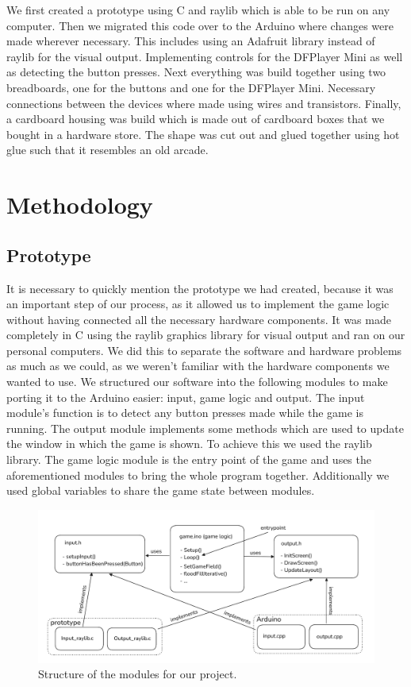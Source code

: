 \documentclass[10pt, a4paper]{article}
\begin{document}
We first created a prototype using C and raylib which is able to be run on any computer. Then we migrated this code over to the Arduino where changes were made wherever necessary. This includes using an Adafruit library instead of raylib for the visual output. Implementing controls for the DFPlayer Mini as well as detecting the button presses. Next everything was build together using two breadboards, one for the buttons and one for the DFPlayer Mini. Necessary connections between the devices where made using wires and transistors. Finally, a cardboard housing was build which is made out of cardboard boxes that we bought in a hardware store. The shape was cut out and glued together using hot glue such that it resembles an old arcade.

\section*{Methodology}

\subsection*{Prototype}

It is necessary to quickly mention the prototype we had created, because it was an important step of our process, as it allowed us to implement the game logic without having connected all the necessary hardware components. It was made completely in C using the raylib graphics library for visual output and ran on our personal computers. We did this to separate the software and hardware problems as much as we could, as we weren't familiar with the hardware components we wanted to use. We structured our software into the following modules to make porting it to the Arduino easier: input, game logic and output. The input module's function is to detect any button presses made while the game is running. The output module implements some methods which are used to update the window in which the game is shown. To achieve this we used the raylib library. The game logic module is the entry point of the game and uses the aforementioned modules to bring the whole program together. Additionally we used global variables to share the game state between modules.

\begin{figure}[h]
\centering
\includegraphics[width=\textwidth]{module_structure.png}
\caption{Structure of the modules for our project.}
\end{figure}
\end{document}
